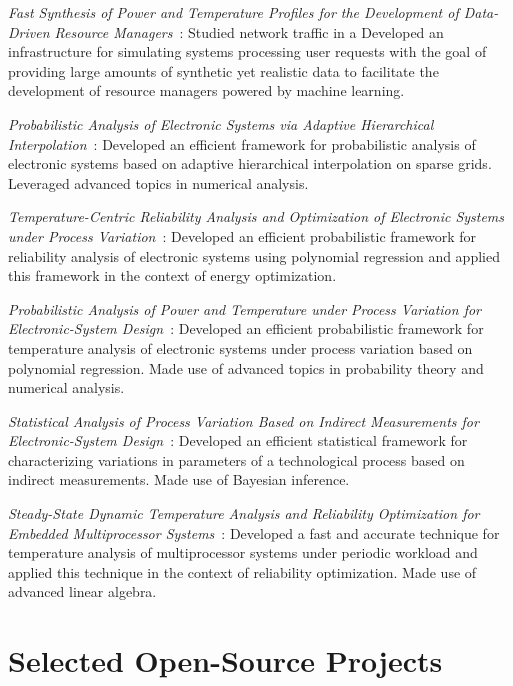\documentclass[journal]{IEEEtran}
\begin{document}
\date{2017} \emph{Fast Synthesis of Power and Temperature Profiles for the
Development of Data-Driven Resource Managers}~\cite{ukhov2017c}: Studied network
traffic in a 
Developed an infrastructure for simulating systems processing user requests with
the goal of providing large amounts of synthetic yet realistic data to
facilitate the development of resource managers powered by machine learning.

\date{2017} \emph{Probabilistic Analysis of Electronic Systems via Adaptive
Hierarchical Interpolation}~\cite{ukhov2017a}: Developed an efficient framework
for probabilistic analysis of electronic systems based on adaptive hierarchical
interpolation on sparse grids. Leveraged advanced topics in numerical analysis.

\date{2015} \emph{Temperature-Centric Reliability Analysis and Optimization of
Electronic Systems under Process Variation}~\cite{ukhov2015}: Developed an
efficient probabilistic framework for reliability analysis of electronic systems
using polynomial regression and applied this framework in the context of energy
optimization.

\date{2014} \emph{Probabilistic Analysis of Power and Temperature under Process
Variation for Electronic-System Design}~\cite{ukhov2014b}: Developed an
efficient probabilistic framework for temperature analysis of electronic systems
under process variation based on polynomial regression. Made use of advanced
topics in probability theory and numerical analysis.

\date{2014} \emph{Statistical Analysis of Process Variation Based on Indirect
Measurements for Electronic-System Design}~\cite{ukhov2014a}: Developed an
efficient statistical framework for characterizing variations in parameters of a
technological process based on indirect measurements. Made use of Bayesian
inference.

\date{2012} \emph{Steady-State Dynamic Temperature Analysis and Reliability
Optimization for Embedded Multiprocessor Systems}~\cite{ukhov2012}: Developed a
fast and accurate technique for temperature analysis of multiprocessor systems
under periodic workload and applied this technique in the context of reliability
optimization. Made use of advanced linear algebra.

\section{Selected Open-Source Projects} 
\end{document}
